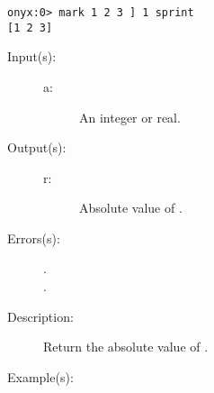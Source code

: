 \begin{description}
\begin{description}
\begin{verbatim}
onyx:0> mark 1 2 3 ] 1 sprint
[1 2 3]
		\end{verbatim}
	\end{description}
\label{systemdict:abs}
\item[{\onyxop{a}{abs}{r}}: ]
	\begin{description}\item[]
	\item[Input(s): ]
		\begin{description}\item[]
		\item[a: ]
			An integer or real.
		\end{description}
	\item[Output(s): ]
		\begin{description}\item[]
		\item[r: ]
			Absolute value of .
		\end{description}
	\item[Errors(s): ]
		\begin{description}\item[]
		\item[.]
		\item[.]
		\end{description}
	\item[Description: ]
		Return the absolute value of .
	\item[Example(s): ]\begin{verbatim}


\end{verbatim}
\end{description}
\end{description}
